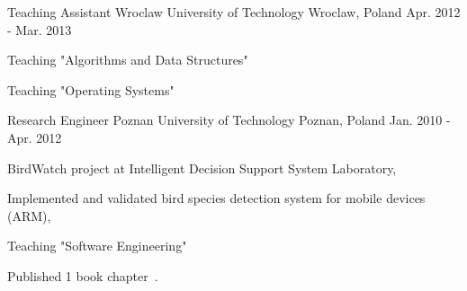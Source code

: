 \begin{cventries}
  \cventry
    {Teaching Assistant} %
    {Wroclaw University of Technology} %
    {Wroclaw, Poland} %
    {Apr. 2012 - Mar. 2013} %
    {
      \begin{cvitems} %
      	\item {Teaching "Algorithms and Data Structures"}
      	\item {Teaching "Operating Systems"}
      \end{cvitems}
    }

  \cventry
    {Research Engineer} %
    {Poznan University of Technology} %
    {Poznan, Poland} %
    {Jan. 2010 - Apr. 2012} %
    {
      \begin{cvitems} %
      	\item {BirdWatch project at Intelligent Decision Support System Laboratory,}
        \item {Implemented and validated bird species detection system for mobile devices (ARM), }
      	\item {Teaching "Software Engineering"}
        \item {Published 1 book chapter~\cite{kirchner:2011}.}
      \end{cvitems}
    }


\end{cventries}
